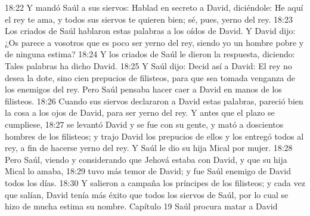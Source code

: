 18:22 Y mandó Saúl a sus siervos: Hablad en secreto a David, diciéndole: He aquí el rey te ama, y todos sus siervos te quieren bien; sé, pues, yerno del rey.  
18:23 Los criados de Saúl hablaron estas palabras a los oídos de David. Y David dijo: ¿Os parece a vosotros que es poco ser yerno del rey, siendo yo un hombre pobre y de ninguna estima?  
18:24 Y los criados de Saúl le dieron la respuesta, diciendo: Tales palabras ha dicho David.  
18:25 Y Saúl dijo: Decid así a David: El rey no desea la dote, sino cien prepucios de filisteos, para que sea tomada venganza de los enemigos del rey. Pero Saúl pensaba hacer caer a David en manos de los filisteos.  
18:26 Cuando sus siervos declararon a David estas palabras, pareció bien la cosa a los ojos de David, para ser yerno del rey. Y antes que el plazo se cumpliese,  
18:27 se levantó David y se fue con su gente, y mató a doscientos hombres de los filisteos; y trajo David los prepucios de ellos y los entregó todos al rey, a fin de hacerse yerno del rey. Y Saúl le dio su hija Mical por mujer.  
18:28 Pero Saúl, viendo y considerando que Jehová estaba con David, y que su hija Mical lo amaba,  
18:29 tuvo más temor de David; y fue Saúl enemigo de David todos los días.  
18:30 Y salieron a campaña los príncipes de los filisteos; y cada vez que salían, David tenía más éxito que todos los siervos de Saúl, por lo cual se hizo de mucha estima su nombre.  
Capítulo 19
Saúl procura matar a David  

